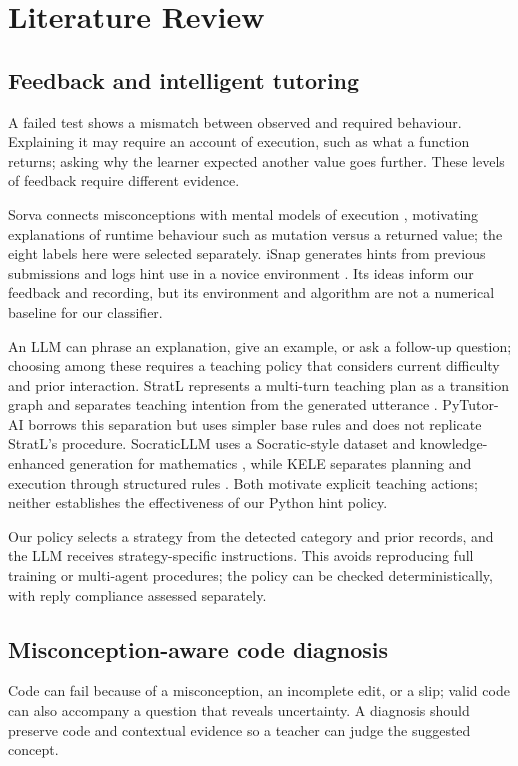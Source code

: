 \chapter{Literature Review}
\label{ch:literature}

\section{Feedback and intelligent tutoring}
A failed test shows a mismatch between observed and required behaviour. Explaining it may require an account of execution, such as what a function returns; asking why the learner expected another value goes further. These levels of feedback require different evidence.

Sorva connects misconceptions with mental models of execution \citep{sorva2013}, motivating explanations of runtime behaviour such as mutation versus a returned value; the eight labels here were selected separately. iSnap generates hints from previous submissions and logs hint use in a novice environment \citep{isnap2017}. Its ideas inform our feedback and recording, but its environment and algorithm are not a numerical baseline for our classifier.

An LLM can phrase an explanation, give an example, or ask a follow-up question; choosing among these requires a teaching policy that considers current difficulty and prior interaction. StratL represents a multi-turn teaching plan as a transition graph and separates teaching intention from the generated utterance \citep{stratl2025}. PyTutor-AI borrows this separation but uses simpler base rules and does not replicate StratL's procedure. SocraticLLM uses a Socratic-style dataset and knowledge-enhanced generation for mathematics \citep{socratic2024}, while KELE separates planning and execution through structured rules \citep{kele2025}. Both motivate explicit teaching actions; neither establishes the effectiveness of our Python hint policy.

Our policy selects a strategy from the detected category and prior records, and the LLM receives strategy-specific instructions. This avoids reproducing full training or multi-agent procedures; the policy can be checked deterministically, with reply compliance assessed separately.

\section{Misconception-aware code diagnosis}
Code can fail because of a misconception, an incomplete edit, or a slip; valid code can also accompany a question that reveals uncertainty. A diagnosis should preserve code and contextual evidence so a teacher can judge the suggested concept.

